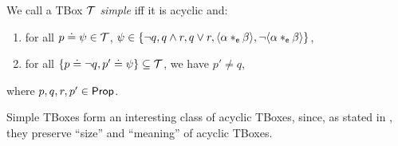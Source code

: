 
\begin{definition}\label{def:simple-tbox}
    We call a TBox $\mathcal{T}$ \emph{simple} iff it is acyclic and:
    \begin{enumerate}
        \item for all $p \doteq \psi\in\mathcal{T}$, $\psi \in \{\neg q, q\land r, q\lor r, \langle{\alpha*_{\mathsf{e}}\beta}\rangle, \lnot\langle{\alpha*_{\mathsf{e}}\beta}\rangle\}$,
        \item for all $\{p\doteq\lnot{q}, p'\doteq\psi\}\subseteq\mathcal{T}$, we have $p'\neq q$,
    \end{enumerate} 
    where $p,q,r,p'\in\mathsf{Prop}$.
\end{definition}

Simple TBoxes form an interesting class of acyclic TBoxes, since, as stated in , they preserve ``size'' and ``meaning'' of acyclic TBoxes.

